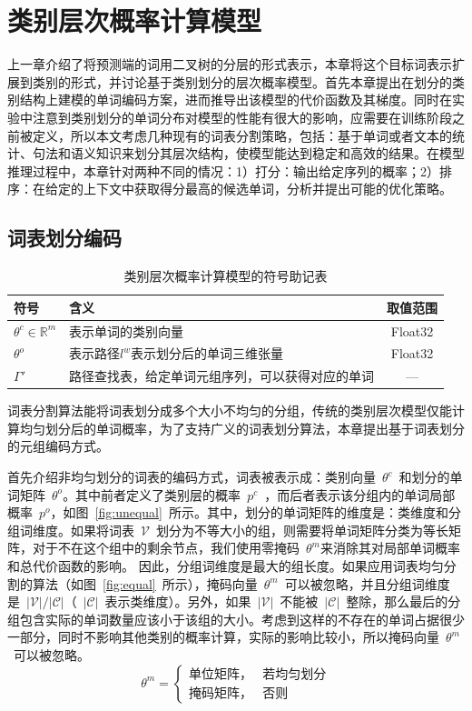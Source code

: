 \chapter{类别层次概率计算模型}
上一章介绍了将预测端的词用二叉树的分层的形式表示，本章将这个目标词表示扩展到类别的形式，并讨论基于类别划分的层次概率模型。首先本章提出在划分的类别结构上建模的单词编码方案，进而推导出该模型的代价函数及其梯度。同时在实验中注意到类别划分的单词分布对模型的性能有很大的影响，应需要在训练阶段之前被定义，所以本文考虑几种现有的词表分割策略，包括：基于单词或者文本的统计、句法和语义知识来划分其层次结构，使模型能达到稳定和高效的结果。在模型推理过程中，本章针对两种不同的情况：1）打分：输出给定序列的概率；2）排序：在给定的上下文中获取得分最高的候选单词，分析并提出可能的优化策略。


\section{词表划分编码}
\begin{table}[!ht]
  \centering
  \caption{类别层次概率计算模型的符号助记表}
\begin{tabular}{llc}
  \toprule
   符号&含义&取值范围\\ \midrule
$\theta^c\in\mathbb{R}^m$ &表示单词的类别向量& Float32\\
$ \theta^o$ &表示路径$l^w$表示划分后的单词三维张量&Float32 \\
$\Gamma'$ &路径查找表，给定单词元组序列，可以获得对应的单词&--- \\
  \bottomrule
\end{tabular}
\end{table}
词表分割算法能将词表划分成多个大小不均匀的分组，传统的类别层次模型仅能计算均匀划分后的单词概率，为了支持广义的词表划分算法，本章提出基于词表划分的元组编码方式。

首先介绍非均匀划分的词表的编码方式，词表被表示成：类别向量~$\theta^c$~和划分的单词矩阵~$\theta^o$。其中前者定义了类别层的概率~$p^c$~，而后者表示该分组内的单词局部概率~$p^o$，如图~\ref{fig:unequal}~所示。其中，划分的单词矩阵的维度是：类维度和分组词维度。如果将词表~$\mathcal{V}$~划分为不等大小的组，则需要将单词矩阵分类为等长矩阵，对于不在这个组中的剩余节点，我们使用零掩码~$\theta^m$来消除其对局部单词概率和总代价函数的影响。
因此，分组词维度是最大的组长度。如果应用词表均匀分割的算法（如图~\ref{fig:equal}~所示），掩码向量~$\theta^m$~可以被忽略，并且分组词维度是~$\mathcal{|V|/|C|}$（~$\mathcal{|C|}$~表示类维度）。另外，如果~$\mathcal{|V|}$~不能被~$\mathcal{|C|}$~整除，那么最后的分组包含实际的单词数量应该小于该组的大小。考虑到这样的不存在的单词占据很少一部分，同时不影响其他类别的概率计算，实际的影响比较小，所以掩码向量~$\theta^m$~可以被忽略。
\begin{equation}\label{equ:partition}
 \theta^m=
\begin{cases}
    \text{单位矩阵，}& \text{若均匀划分} \\
    \text{掩码矩阵，} & \text{否则}
\end{cases}
\end{equation}

